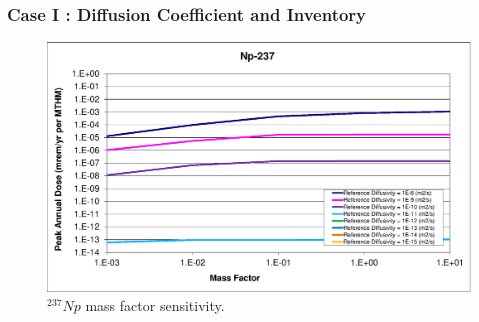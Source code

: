 \begin{frame}[c]
  \frametitle{Case I : Diffusion Coefficient and Inventory}

\begin{figure}[ht!]
\centering
\includegraphics[width=\linewidth]{DiffCoeffAndInvEBSFail/Np-237-MF.eps}
\caption{$^{237}Np$ mass factor sensitivity.}
\label{fig:DCInvNp237MF}
\end{figure}
\end{frame}
